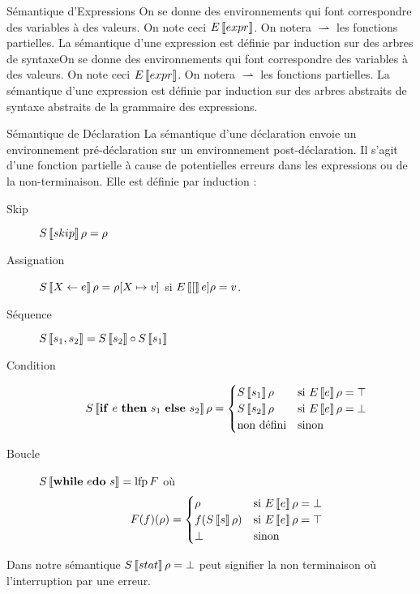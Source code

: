 \documentclass{cours}
\begin{document}
\begin{définition}{Sémantique d'Expressions}{}
    On se donne des environnements qui font correspondre des variables à des valeurs. On note ceci $E\left\llbracket expr \right\rrbracket$. On notera $\rightharpoonup$ les fonctions partielles. La sémantique d'une expression est définie par induction sur des arbres de syntaxeOn se donne des environnements qui font correspondre des variables à des valeurs. On note ceci $E\left\llbracket expr \right\rrbracket$. On notera $\rightharpoonup$ les fonctions partielles. La sémantique d'une expression est définie par induction sur des arbres abstraits de syntaxe abstraits de la grammaire des expressions.
\end{définition}

\begin{définition}{Sémantique de Déclaration}{}
    La sémantique d'une déclaration envoie un environnement pré-déclaration sur un environnement post-déclaration. Il s'agit d'une fonction partielle à cause de potentielles erreurs dans les expressions ou de la non-terminaison. Elle est définie par induction : 
    \begin{description}
        \item[Skip] $S\left\llbracket skip \right\rrbracket\rho = \rho$
        \item[Assignation] $S\left\llbracket X \gets e \right\rrbracket\rho = \rho[X \mapsto v]$ si $E\left\llbracket [ \right\rrbracket e]\rho = v$. 
        \item[Séquence] $S\left\llbracket s_{1}, s_{2} \right\rrbracket = S\left\llbracket s_{2} \right\rrbracket \circ S\left\llbracket s_{1} \right\rrbracket$ 
        \item[Condition] \[
            S\sem{{\bf if}\ e\ {\bf then}\ s_{1}\ {\bf else}\ s_{2}}\rho = \begin{cases}
                S\sem{s_{1}} \rho & \text{si } E\sem{e} \rho = \top\\
                S\sem{s_{2}} \rho & \text{si } E\sem{e} \rho = \bot\\
                \text{non défini} & \text{sinon}
            \end{cases}
        \] 
        \item[Boucle] $S\left\llbracket {\bf while}\ e {\bf do}\ s \right\rrbracket = \operatorname{lfp} F$ où 
        \[
            F(f)(\rho) = \begin{cases}
                \rho & \text{si } E\left\llbracket e \right\rrbracket \rho = \bot\\
                f(S\left\llbracket s \right\rrbracket\rho) & \text{si } E\left\llbracket e \right\rrbracket\rho = \top\\
                \bot & \text{sinon}
            \end{cases}
        \]
    \end{description}
    Dans notre sémantique $S\left\llbracket stat \right\rrbracket\rho = \bot$ peut signifier la non terminaison où l'interruption par une erreur. 
\end{définition}
\end{document}
